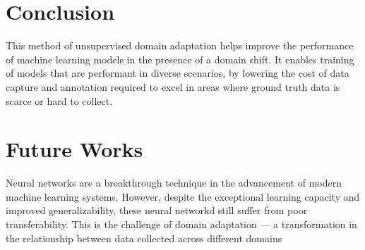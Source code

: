 \justifying
\setlength{\parskip}{1em}



\section{Conclusion}
This method of unsupervised domain adaptation helps improve the performance of machine learning models in the presence of a domain shift. It enables training of models that are performant in diverse scenarios, by lowering the cost of data capture and annotation required to excel in areas where ground truth data is scarce or hard to collect.



\section{Future Works}

Neural networks are a breakthrough technique in the advancement of modern machine learning systems. However, despite the exceptional learning capacity and improved generalizability, these neural networkd still suffer from poor transferability. This is the challenge of domain adaptation — a transformation in the relationship between data collected across different domains 